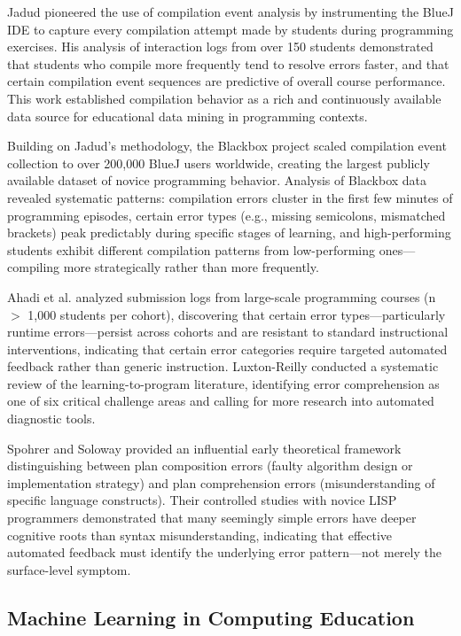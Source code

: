 \documentclass[10pt,letterpaper]{article}
\begin{document}
Jadud \cite{jadud2006methods} pioneered the use of compilation event analysis
by instrumenting the BlueJ IDE to capture every compilation attempt made by
students during programming exercises. His analysis of interaction logs from
over 150 students demonstrated that students who compile more frequently tend
to resolve errors faster, and that certain compilation event sequences are
predictive of overall course performance. This work established compilation
behavior as a rich and continuously available data source for educational data
mining in programming contexts.

Building on Jadud's methodology, the Blackbox project \cite{bey2022analyzing}
scaled compilation event collection to over 200,000 BlueJ users worldwide,
creating the largest publicly available dataset of novice programming behavior.
Analysis of Blackbox data revealed systematic patterns: compilation errors
cluster in the first few minutes of programming episodes, certain error types
(e.g., missing semicolons, mismatched brackets) peak predictably during
specific stages of learning, and high-performing students exhibit different
compilation patterns from low-performing ones---compiling more strategically
rather than more frequently.

Ahadi et al. \cite{ahadi2015exploring} analyzed submission logs from
large-scale programming courses (n $>$ 1,000 students per cohort), discovering
that certain error types---particularly runtime errors---persist across cohorts
and are resistant to standard instructional interventions, indicating that
certain error categories require targeted automated feedback rather than
generic instruction. Luxton-Reilly \cite{barbosa2023feedback} conducted a
systematic review of the learning-to-program literature, identifying error
comprehension as one of six critical challenge areas and calling for more
research into automated diagnostic tools.

Spohrer and Soloway \cite{spohrer1986novice} provided an influential early
theoretical framework distinguishing between plan composition errors (faulty
algorithm design or implementation strategy) and plan comprehension errors
(misunderstanding of specific language constructs). Their controlled studies
with novice LISP programmers demonstrated that many seemingly simple errors
have deeper cognitive roots than syntax misunderstanding, indicating that
effective automated feedback must identify the underlying error pattern---not
merely the surface-level symptom.

\subsection{Machine Learning in Computing Education}
\end{document}
